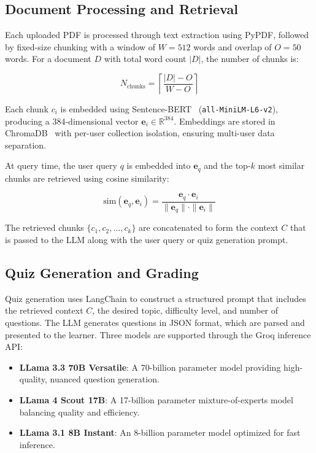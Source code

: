 \documentclass[runningheads]{llncs}
\begin{document}
\subsection{Document Processing and Retrieval}

Each uploaded PDF is processed through text extraction using PyPDF, followed by fixed-size chunking with a window of $W = 512$ words and overlap of $O = 50$ words. For a document $D$ with total word count $|D|$, the number of chunks is:

\begin{equation}
N_{\text{chunks}} = \left\lceil \frac{|D| - O}{W - O} \right\rceil
\label{eq:chunks}
\end{equation}

Each chunk $c_i$ is embedded using Sentence-BERT~\cite{reimers2019sentencebert} (\texttt{all-MiniLM-L6-v2}), producing a 384-dimensional vector $\mathbf{e}_i \in \mathbb{R}^{384}$. Embeddings are stored in ChromaDB~\cite{johnson2023chromadb} with per-user collection isolation, ensuring multi-user data separation.

At query time, the user query $q$ is embedded into $\mathbf{e}_q$ and the top-$k$ most similar chunks are retrieved using cosine similarity:

\begin{equation}
\text{sim}(\mathbf{e}_q, \mathbf{e}_i) = \frac{\mathbf{e}_q \cdot \mathbf{e}_i}{\|\mathbf{e}_q\| \cdot \|\mathbf{e}_i\|}
\label{eq:cosine}
\end{equation}

The retrieved chunks $\{c_1, c_2, \ldots, c_k\}$ are concatenated to form the context $C$ that is passed to the LLM along with the user query or quiz generation prompt.

\subsection{Quiz Generation and Grading}

Quiz generation uses LangChain to construct a structured prompt that includes the retrieved context $C$, the desired topic, difficulty level, and number of questions. The LLM generates questions in JSON format, which are parsed and presented to the learner. Three models are supported through the Groq inference API:

\begin{itemize}
    \item \textbf{LLama 3.3 70B Versatile}: A 70-billion parameter model providing high-quality, nuanced question generation.
    \item \textbf{LLama 4 Scout 17B}: A 17-billion parameter mixture-of-experts model balancing quality and efficiency.
    \item \textbf{LLama 3.1 8B Instant}: An 8-billion parameter model optimized for fast inference.
\end{itemize}
\end{document}
